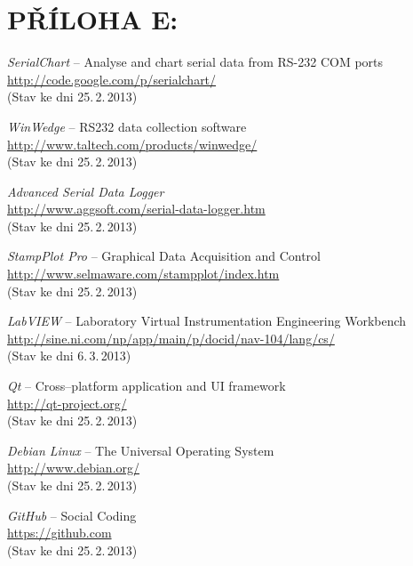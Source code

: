 \documentclass[12pt, a4paper, oneside]{article}
\newcommand{\It}{\textit}  %
\begin{document}
 \section*{PŘÍLOHA E:}
 \begin{thebibliography}{99}

     \It{SerialChart} -- Analyse and chart serial data from RS-232 COM ports \\
    \url{http://code.google.com/p/serialchart/}\\
    (Stav ke dni 25.\,2.\,2013)

     \It{WinWedge} -- RS232 data collection software \\
    \url{http://www.taltech.com/products/winwedge/}\\
    (Stav ke dni 25.\,2.\,2013)

     \It{Advanced Serial Data Logger} \\
    \url{http://www.aggsoft.com/serial-data-logger.htm}\\
    (Stav ke dni 25.\,2.\,2013)

     \It{StampPlot Pro} -- Graphical Data Acquisition and Control \\
    \url{http://www.selmaware.com/stampplot/index.htm}\\
    (Stav ke dni 25.\,2.\,2013)

     \It{LabVIEW} -- Laboratory Virtual Instrumentation Engineering Workbench \\
    \url{http://sine.ni.com/np/app/main/p/docid/nav-104/lang/cs/}\\
    (Stav ke dni 6.\,3.\,2013)

     \It{Qt} -- Cross--platform application and UI framework \\
    \url{http://qt-project.org/}\\
    (Stav ke dni 25.\,2.\,2013)

     \It{Debian Linux} -- The Universal Operating System \\
    \url{http://www.debian.org/}\\
    (Stav ke dni 25.\,2.\,2013)

     \It{GitHub} -- Social Coding \\
    \url{https://github.com}\\
    (Stav ke dni 25.\,2.\,2013)


\end{thebibliography}
\end{document}

